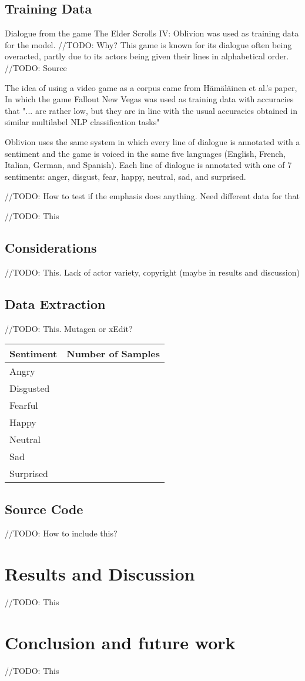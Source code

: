 \documentclass[journal]{IEEEtran}
\begin{document}
\subsection{Training Data}
Dialogue from the game The Elder Scrolls IV: Oblivion was used as training data for the model. //TODO: Why?
This game is known for its dialogue often being overacted, partly due to its actors being given
their lines in alphabetical order. //TODO: Source

The idea of using a video game as a corpus came from Hämäläinen et al.'s paper, \cite{hamalainen_video_2022}
In which the game Fallout New Vegas was used as training data with accuracies that
"... are rather low, but they are in line with the usual accuracies obtained in similar multilabel NLP
classification tasks" \cite[sec. 6]{hamalainen_video_2022}

Oblivion uses the same system in which every line of dialogue is annotated with a sentiment
and the game is voiced in the same five languages (English, French, Italian, German, and Spanish).
Each line of dialogue is annotated with one of 7 sentiments: anger, disgust, fear, happy, neutral, sad, and surprised.

//TODO: How to test if the emphasis does anything. Need different data for that

//TODO: This
\subsection{Considerations}
//TODO: This. Lack of actor variety, copyright (maybe in results and discussion)

\subsection{Data Extraction}
//TODO: This. Mutagen or xEdit?

\begin{tabular}{| l | l |}
    \hline
    Sentiment & Number of Samples \\ \hline
    Angry & \\ \hline
    Disgusted & \\ \hline
    Fearful & \\ \hline
    Happy & \\ \hline
    Neutral & \\ \hline
    Sad & \\ \hline
    Surprised & \\ \hline
\end{tabular}

\subsection{Source Code}
//TODO: How to include this?

\section{Results and Discussion}
//TODO: This

\section{Conclusion and future work}
//TODO: This





\end{document}
